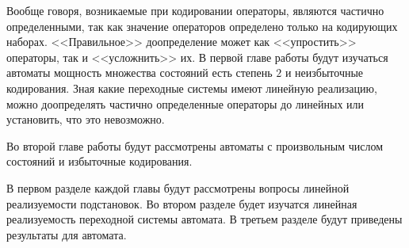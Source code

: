 
\par Вообще говоря, возникаемые при кодировании операторы, являются частично определенными, так как значение операторов определено только на кодирующих наборах. <<Правильное>> доопределение может как <<упростить>> операторы, так и <<усложнить>> их.  В первой главе работы будут изучаться автоматы мощность множества состояний есть степень $2$ и неизбыточные кодирования. Зная какие переходные системы имеют линейную реализацию, можно доопределять частично определенные операторы до линейных или установить, что это невозможно.
\par Во второй главе работы будут рассмотрены автоматы с произвольным числом состояний и избыточные кодирования.
\par В первом разделе каждой главы будут рассмотрены вопросы линейной реализуемости подстановок. Во втором разделе будет изучатся линейная реализуемость переходной системы автомата. В третьем разделе будут приведены результаты для автомата.

